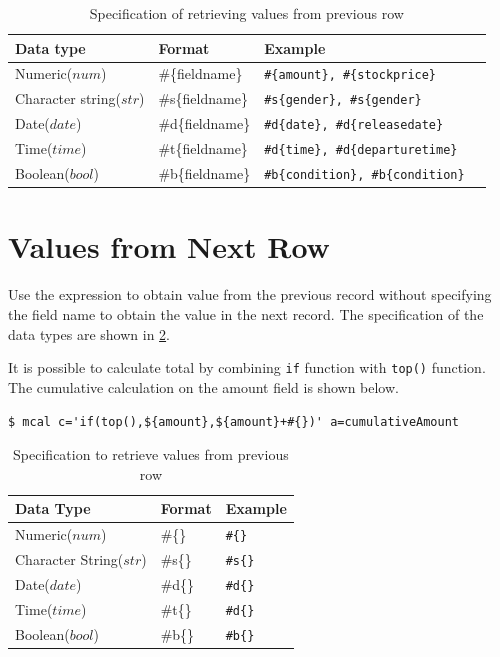 \begin{table}[!hb]
\begin{center}
\caption{Specification of retrieving values from previous row\label{tbl:mcal_prev}}
{\small
  \begin{tabular}{l|lll|} \hline
Data type&Format&Example\\ \hline
Numeric($num$)   & \#\{fieldname\}  & \verb|#{amount}, #{stockprice}|\\
Character string($str$) & \#s\{fieldname\} & \verb|#s{gender}, #s{gender}|\\
Date($date$)  & \#d\{fieldname\} & \verb|#d{date}, #d{releasedate}| \\
Time($time$)  & \#t\{fieldname\} & \verb|#d{time}, #d{departuretime}| \\
Boolean($bool$)  & \#b\{fieldname\} & \verb|#b{condition}, #b{condition}| \\

\hline
  \end{tabular}
  }
  \end{center}
\end{table}

\section{Values from Next Row}
Use the expression to obtain value from the previous record without specifying the field name to obtain the value in the next record.  The specification of the data types are shown in \ref{tbl:mcal_prev_rsl}. 

It is possible to calculate total by combining \verb|if| function with \verb|top()| function. The cumulative calculation on the amount field is shown below.  


\verb|$ mcal c='if(top(),${amount},${amount}+#{})' a=cumulativeAmount|


\begin{table}[!hb]
\begin{center}
\caption{Specification to retrieve values from previous row\label{tbl:mcal_prev_rsl}}
{\small
  \begin{tabular}{l|l|l} \hline
Data Type&Format&Example\\ \hline
Numeric($num$)   & \#\{\}  & \verb|#{}|\\
Character String($str$) & \#s\{\} & \verb|#s{}|\\
Date($date$)  & \#d\{\} & \verb|#d{}| \\
Time($time$)  & \#t\{\} & \verb|#d{}| \\
Boolean($bool$)  & \#b\{\} & \verb|#b{}| \\

\hline
  \end{tabular}
  }
  \end{center}
\end{table}


